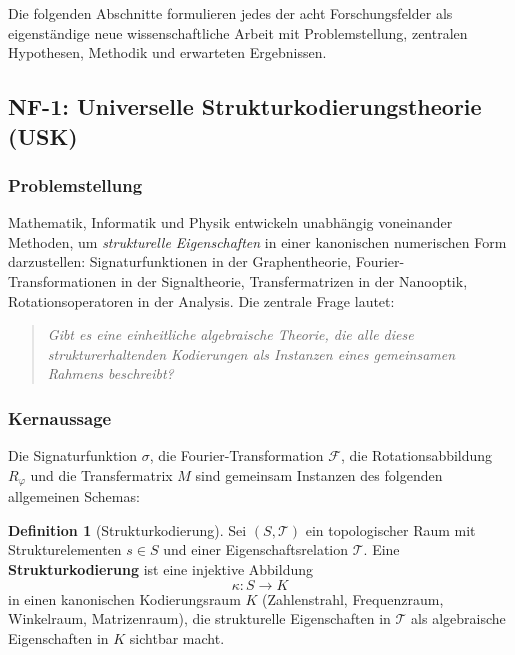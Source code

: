 ﻿\documentclass[a4paper,12pt]{scrreprt}
\theoremstyle{definition}
\newtheorem{definition}{Definition}[section]
\begin{document}
Die folgenden Abschnitte formulieren jedes der acht Forschungsfelder
als eigenständige neue wissenschaftliche Arbeit mit Problemstellung,
zentralen Hypothesen, Methodik und erwarteten Ergebnissen.

\subsection{NF-1: Universelle Strukturkodierungstheorie (USK)}

\subsubsection{Problemstellung}

Mathematik, Informatik und Physik entwickeln unabhängig voneinander Methoden,
um \emph{strukturelle Eigenschaften} in einer kanonischen numerischen Form
darzustellen: Signaturfunktionen in der Graphentheorie, Fourier-Transformationen
in der Signaltheorie, Transfermatrizen in der Nanooptik, Rotationsoperatoren
in der Analysis. Die zentrale Frage lautet:

\begin{quote}
  \itshape
  Gibt es eine einheitliche algebraische Theorie, die alle diese
  strukturerhaltenden Kodierungen als Instanzen eines gemeinsamen Rahmens
  beschreibt?
\end{quote}

\subsubsection{Kernaussage}

Die Signaturfunktion $\sigma$, die Fourier-Transformation $\mathcal{F}$,
die Rotationsabbildung $R_\varphi$ und die Transfermatrix $M$ sind
gemeinsam Instanzen des folgenden allgemeinen Schemas:

\begin{definition}[Strukturkodierung]
  Sei $(S, \mathcal{T})$ ein topologischer Raum mit Strukturelementen
  $s \in S$ und einer Eigenschaftsrelation $\mathcal{T}$. Eine
  \textbf{Strukturkodierung} ist eine injektive Abbildung
  \[
    \kappa: S \longrightarrow K
  \]
  in einen kanonischen Kodierungsraum $K$ (Zahlenstrahl, Frequenzraum,
  Winkelraum, Matrizenraum), die strukturelle Eigenschaften in
  $\mathcal{T}$ als algebraische Eigenschaften in $K$ sichtbar macht.
\end{definition}
\end{document}
